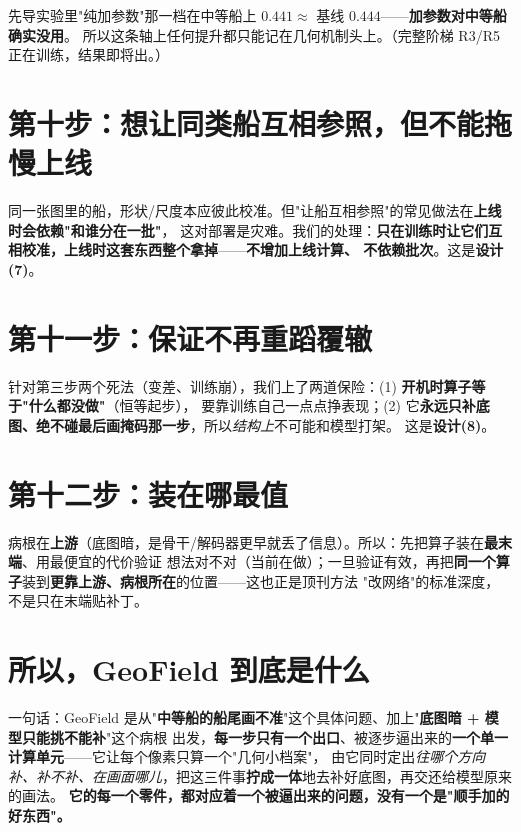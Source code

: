\documentclass[UTF8,11pt,a4paper]{ctexart}
\begin{document}
\begin{eviw}
先导实验里"纯加参数"那一档在中等船上 $0.441\approx$ 基线 $0.444$——\textbf{加参数对中等船确实没用}。
所以这条轴上任何提升都只能记在几何机制头上。（完整阶梯 R3/R5 正在训练，结果即将出。）
\end{eviw}

\section{第十步：想让同类船互相参照，但不能拖慢上线}
同一张图里的船，形状/尺度本应彼此校准。但"让船互相参照"的常见做法在\textbf{上线时会依赖"和谁分在一批"}，
这对部署是灾难。我们的处理：\textbf{只在训练时让它们互相校准，上线时这套东西整个拿掉}——\textbf{不增加上线计算、
不依赖批次}。这是\textbf{设计(7)}。

\section{第十一步：保证不再重蹈覆辙}
针对第三步两个死法（变差、训练崩），我们上了两道保险：(1) \textbf{开机时算子等于"什么都没做"}（恒等起步），
要靠训练自己一点点挣表现；(2) 它\textbf{永远只补底图、绝不碰最后画掩码那一步}，所以\emph{结构上}不可能和模型打架。
这是\textbf{设计(8)}。

\section{第十二步：装在哪最值}
病根在\textbf{上游}（底图暗，是骨干/解码器更早就丢了信息）。所以：先把算子装在\textbf{最末端}、用最便宜的代价验证
想法对不对（当前在做）；一旦验证有效，再把\textbf{同一个算子}装到\textbf{更靠上游、病根所在}的位置——这也正是顶刊方法
"改网络"的标准深度，不是只在末端贴补丁。

\section{所以，GeoField 到底是什么}
\begin{tcolorbox}[colback=boxg!45,colframe=good!65,boxrule=0.6pt,left=6pt,right=6pt,top=4pt,bottom=4pt,arc=2pt]
一句话：GeoField 是从"\textbf{中等船的船尾画不准}"这个具体问题、加上"\textbf{底图暗 + 模型只能挑不能补}"这个病根
出发，\textbf{每一步只有一个出口}、被逐步逼出来的\textbf{一个单一计算单元}——它让每个像素只算一个"几何小档案"，
由它同时定出\emph{往哪个方向补、补不补、在画面哪儿}，把这三件事\textbf{拧成一体}地去补好底图，再交还给模型原来的画法。
\textbf{它的每一个零件，都对应着一个被逼出来的问题，没有一个是"顺手加的好东西"。}
\end{tcolorbox}
\end{document}
